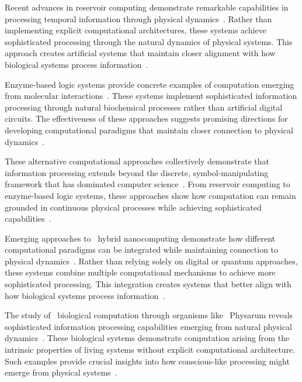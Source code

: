 Recent advances in reservoir computing demonstrate remarkable capabilities in processing temporal information through physical dynamics~\cite{Jaeger2021,van2025processes,pinotsis2023vivo}. Rather than implementing explicit computational architectures, these systems achieve sophisticated processing through the natural dynamics of physical systems. This approach creates artificial systems that maintain closer alignment with how~ biological systems process information~\cite{Magnasco1997,varela2017embodied}.

 Enzyme-based logic systems provide concrete examples of computation emerging from molecular interactions~\cite{Katz2019,Dittrich2018,li2017neuralloss}. These systems implement sophisticated information processing through natural biochemical processes rather than artificial digital circuits. The effectiveness of these approaches suggests promising directions for developing computational paradigms that maintain closer connection to physical dynamics~\cite{lane2010life,levin2020revisiting}.

These alternative computational approaches collectively demonstrate that information processing extends beyond the discrete, symbol-manipulating framework that has dominated computer science~\cite{Levin2018,putnam1988representation,turing1936computable}. From reservoir computing to enzyme-based logic systems, these approaches show how computation can remain grounded in continuous physical processes while achieving sophisticated capabilities~\cite{Wegner2003,clark1998being}.

Emerging approaches to~ hybrid nanocomputing demonstrate how different computational paradigms can be integrated while maintaining connection to physical dynamics~\cite{Mayne2019,Larkum2022}. Rather than relying solely on digital or quantum approaches, these systems combine multiple computational mechanisms to achieve more sophisticated processing. This integration creates systems that better align with how biological systems process information~\cite{pellerin2004neuroenergetics,gershman2023molecular}.

The study of~ biological computation through organisms like~ Physarum reveals sophisticated information processing capabilities emerging from natural physical dynamics~\cite{Nakagaki2020,Friston2010,varela1996neurophenomenology}. These biological systems demonstrate computation arising from the intrinsic properties of living systems without explicit computational architecture. Such examples provide crucial insights into how conscious-like processing might emerge from physical systems~\cite{bejan2011constructal,Polsky2004}.

